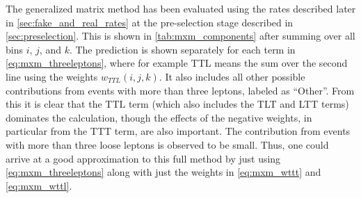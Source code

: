 The generalized matrix method has been 
evaluated using the rates described later 
in \sec\ref{sec:fake_and_real_rates}
at the pre-selection stage described in \sec\ref{sec:preselection}.
This is shown in \tab\ref{tab:mxm_components}
after summing over all bins $i$, $j$, and $k$.
The prediction is shown separately for each term in 
\eqn\eqref{eq:mxm_threeleptons}, where for example TTL means
the sum over the second line using the weights $w_{TTL}(i,j,k)$.
It also includes all other possible contributions from 
events with more than three leptons, labeled as ``Other''. 
From this it is clear that the TTL 
term (which also includes the TLT and LTT terms) 
dominates the calculation,
though the effects of the negative weights, in particular from the TTT
term, are also important. The contribution
from events with more than three loose leptons is observed to be small.
Thus, one could arrive at a good approximation to this full method
by just using \eqn\eqref{eq:mxm_threeleptons} along with just the
weights in \eqn\eqref{eq:mxm_wttt} and \eqref{eq:mxm_wttl}.



